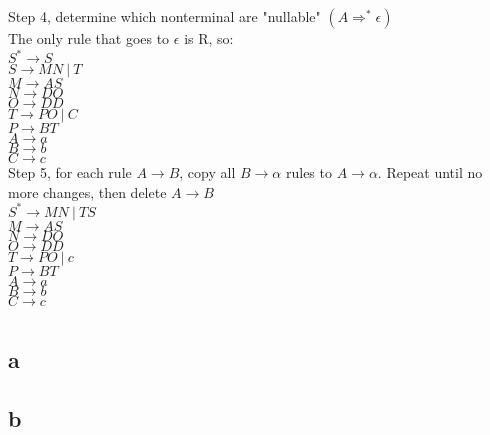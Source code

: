 \documentclass[10pt,letterpaper]{article}
\begin{document}
Step 4, determine which nonterminal are "nullable" $(A \Rightarrow^* \epsilon)$\\
The only rule that goes to $\epsilon$ is R, so:\\
$S^* \rightarrow S$\\
$S \rightarrow MN\ |\ T$\\
$M \rightarrow AS$\\
$N \rightarrow DO$\\
$O \rightarrow DD$\\
$T \rightarrow PO\ |\ C$\\
$P \rightarrow BT$\\
$A \rightarrow a$\\
$B \rightarrow b$\\
$C \rightarrow c$\\

Step 5, for each rule $A \rightarrow B$, copy all $B \rightarrow \alpha$ rules to
$A \rightarrow \alpha$. Repeat until no more changes, then delete $A \rightarrow B$\\
$S^* \rightarrow MN\ |\ TS$\\
$M \rightarrow AS$\\
$N \rightarrow DO$\\
$O \rightarrow DD$\\
$T \rightarrow PO\ |\ c$\\
$P \rightarrow BT$\\
$A \rightarrow a$\\
$B \rightarrow b$\\
$C \rightarrow c$\\



\section{}
\subsection*{a}
\subsection*{b}
\end{document}
